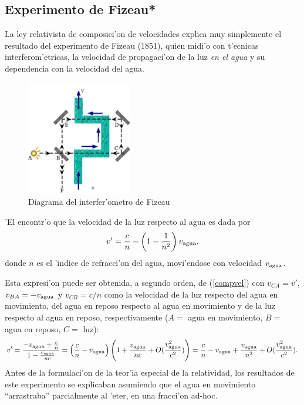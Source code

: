 

\subsection{Experimento de Fizeau*}
La ley relativista de composici'on de velocidades explica muy simplemente el
resultado del experimento de Fizeau (1851), quien midi'o con t'ecnicas
interferom'etricas, la velocidad de propagaci'on de la luz \textit{en el agua}
y su dependencia con la velocidad del agua.
\begin{figure}[!h]
\centerline{\includegraphics[height=5cm]{fig/fig-fizeau.pdf}}
 \caption{Diagrama del interfer'ometro de Fizeau}
\label{fizeau}
\end{figure}
'El encontr'o que la velocidad de la luz respecto al agua es dada por
\begin{equation}
v'=\frac{c}{n}-\left(1-\frac{1}{n^2}\right)v_{\rm agua} ,
\end{equation}
donde $n$ es el 'indice de refracci'on del agua, movi'endose con velocidad $v_{\rm agua}$.

Esta expresi'on puede ser obtenida, a segundo orden, de (\ref{compvel}) con
$v_{CA}=v'$, $v_{BA}=-v_{\rm agua}$ y $v_{CB}=c/n$ como la velocidad de la luz
respecto del agua en movimiento, del agua en reposo respecto al agua en
movimiento y de la luz respecto al agua en reposo, respectivamente ($A=$ agua
en movimiento, $B=$ agua en reposo, $C=$ luz):
\begin{equation}
v'=\frac{-v_{\rm agua}+\frac{c}{n}}{1-\frac{v_{\rm
agua}}{nc}}=\left(\frac{c}{n}-v_{\rm agua}\right)\left(1+\frac{v_{\rm
agua}}{nc}+O(\frac{v_{\rm agua}^2}{c^2})\right)=\frac{c}{n}-v_{\rm
agua}+\frac{v_{\rm agua}}{n^2}+O(\frac{v_{\rm
agua}^2}{c^2}).
\end{equation}
Antes de la formulaci'on de la teor'ia especial de la relatividad, los
resultados de este experimento se explicaban asumiendo que el agua en movimiento
``arrastraba'' parcialmente al 'eter, en una fracci'on ad-hoc.


